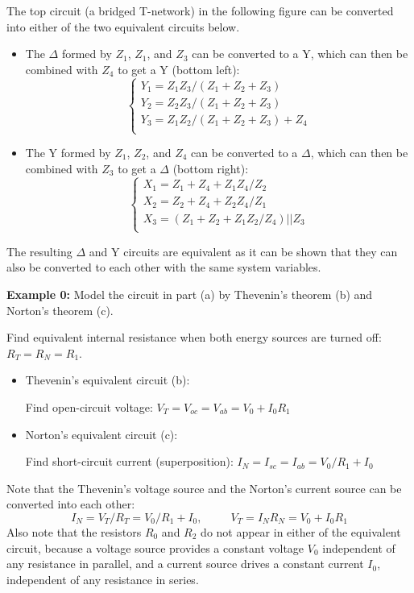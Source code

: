 \begin{itemize}
The top circuit (a bridged T-network) in the following figure can
be converted into either of the two equivalent circuits below.


\begin{itemize}
\item The $\Delta$ formed by $Z_1$, $Z_1$, and $Z_3$ can be converted 
  to a Y, which can then be combined with $Z_4$ to get a Y (bottom left):
  \[
  \left\{ \begin{array}{l}
  Y_1=Z_1Z_3/(Z_1+Z_2+Z_3) \\
  Y_2=Z_2Z_3/(Z_1+Z_2+Z_3) \\
  Y_3=Z_1Z_2/(Z_1+Z_2+Z_3)+Z_4 \\
  \end{array} \right. 
  \]
\item The Y formed by $Z_1$, $Z_2$, and $Z_4$ can be converted to a 
  $\Delta$, which can then be combined with $Z_3$ to get a $\Delta$ 
  (bottom right):
  \[
  \left\{ \begin{array}{l}
    X_1=Z_1+Z_4+Z_1Z_4/Z_2 \\
    X_2=Z_2+Z_4+Z_2Z_4/Z_1 \\
    X_3=(Z_1+Z_2+Z_1Z_2/Z_4) || Z_3 \\
  \end{array} \right. 
  \]
\end{itemize}
The resulting $\Delta$ and Y circuits are equivalent as it can be
shown that they can also be converted to each other with the same 
system variables.


{\bf Example 0:} Model the circuit in part (a) by Thevenin's theorem (b)
and Norton's theorem (c).


Find equivalent internal resistance when both energy sources
are turned off: $R_T=R_N=R_1$.

\begin{itemize}
\item Thevenin's equivalent circuit (b):

  Find open-circuit voltage: $V_T=V_{oc}=V_{ab}=V_0+I_0R_1$
\item Norton's equivalent circuit (c):

  Find short-circuit current (superposition):
  $I_N=I_{sc}=I_{ab}=V_0/R_1+I_0$
\end{itemize}
Note that the Thevenin's voltage source and the Norton's current 
source can be converted into each other:
  \[ 
  I_N=V_T/R_T=V_0/R_1+I_0,\;\;\;\;\;\;\;\;\;
  V_T=I_N R_N=V_0+I_0R_1	
  \]
Also note that the resistors $R_0$ and $R_2$ do not appear in either of
the equivalent circuit, because a voltage source provides a constant
voltage $V_0$ independent of any resistance in parallel, and a current 
source drives a constant current $I_0$, independent of any resistance 
in series. 


\end{itemize}
